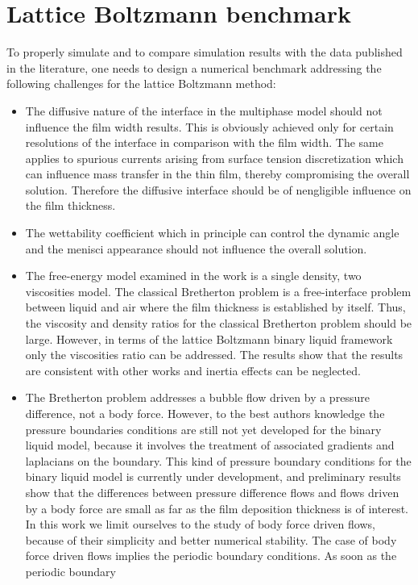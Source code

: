 \documentclass{article}
\begin{document}
\section{Lattice Boltzmann benchmark}
To properly simulate and to compare simulation results with the data
published in the literature, one needs to design a numerical benchmark addressing
the following challenges for the lattice Boltzmann method:
\begin{itemize}
 \item The diffusive nature of the interface in the multiphase model should not
influence the film width results. This is obviously achieved only for certain
resolutions of the interface in comparison with the film width. The same applies to spurious
currents arising from surface tension discretization which
can influence mass transfer in the thin film, thereby compromising the
overall solution. Therefore the diffusive interface should be of nengligible influence on the film
thickness.
 \item The wettability coefficient which in principle can control the
dynamic angle and the menisci appearance \cite{pagonabarraga-finger} should not
influence the overall solution.
 \item The free-energy model examined in the work is a single density, two
viscosities model. The classical Bretherton problem is a free-interface problem between liquid and
air
where the film thickness is established by itself. Thus, the viscosity and density ratios for the
classical
Bretherton problem should
be large. However, in terms of the lattice Boltzmann binary liquid framework only the viscosities
ratio can be addressed. The results show that the results are consistent with other works and
inertia effects can be neglected.
  \item The Bretherton problem addresses a bubble flow driven by a pressure
difference, not a body force. However, to the best authors knowledge the pressure boundaries
conditions are still not yet developed for the binary liquid model, because it involves the
treatment of associated gradients and laplacians on the boundary.
This kind of pressure boundary conditions for the binary liquid model is currently
under development, and preliminary results show that the differences between
pressure difference flows and flows driven by a body force are small as far as the film
deposition thickness is of interest.  In this work we limit ourselves to the study
of body force driven flows, because of their simplicity and better numerical stability. The case of
body force driven flows implies the periodic boundary conditions. As soon as the periodic boundary

\end{itemize}
\end{document}

